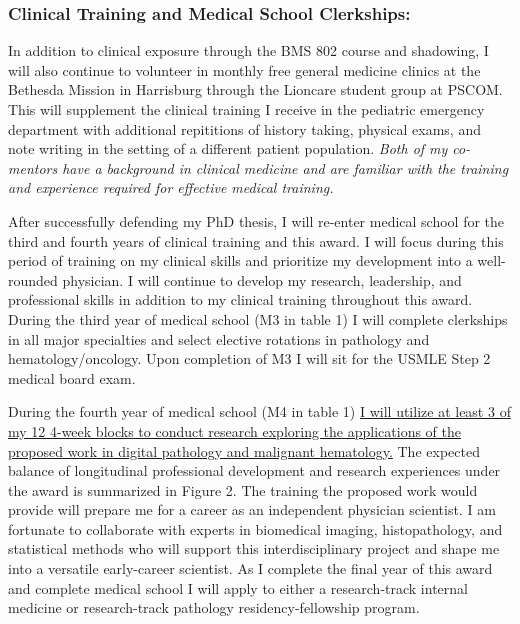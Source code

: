 \documentclass{NIHGrant}
\begin{document}
\subsubsection*{Clinical Training and Medical School Clerkships:}
In addition to clinical exposure through the BMS 802 course and shadowing, I will also continue to volunteer in monthly free general medicine clinics at the Bethesda Mission in Harrisburg through the Lioncare student group at PSCOM. This will supplement the clinical training I receive in the pediatric emergency department with additional repititions of history taking, physical exams, and note writing in the setting of a different patient population. \emph{Both of my co-mentors have a background in clinical medicine and are familiar with the training and experience required for effective medical training.}

After successfully defending my PhD thesis, I will re-enter medical school for the third and fourth years of clinical training and this award. I will focus during this period of training on my clinical skills and prioritize my development into a well-rounded physician. I will continue to develop my research, leadership, and professional skills in addition to my clinical training throughout this award. During the third year of medical school (M3 in table 1) I will complete clerkships in all major specialties and select elective rotations in pathology and hematology/oncology. Upon completion of M3 I will sit for the USMLE Step 2 medical board exam.

During the fourth year of medical school (M4 in table 1) \uline{I will utilize at least 3 of my 12 4-week blocks to conduct research exploring the applications of the proposed work in digital pathology and malignant hematology.} The expected balance of longitudinal professional development and research experiences under the award is summarized in Figure 2. The training the proposed work would provide will prepare me for a career as an independent physician scientist. I am fortunate to collaborate with experts in biomedical imaging, histopathology, and statistical methods who will support this interdisciplinary project and shape me into a versatile early-career scientist. As I complete the final year of this award and complete medical school I will apply to either a research-track internal medicine or research-track pathology residency-fellowship program.
\end{document}
